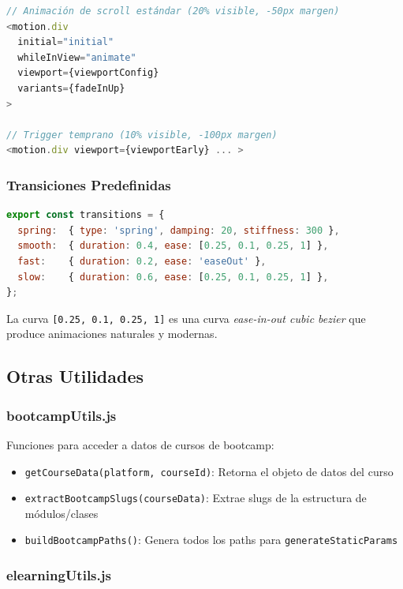 \documentclass[12pt,a4paper]{article}
\begin{document}
\begin{lstlisting}[language=JavaScript]
// Animación de scroll estándar (20% visible, -50px margen)
<motion.div
  initial="initial"
  whileInView="animate"
  viewport={viewportConfig}
  variants={fadeInUp}
>

// Trigger temprano (10% visible, -100px margen)
<motion.div viewport={viewportEarly} ... >
\end{lstlisting}

\subsubsection{Transiciones Predefinidas}

\begin{lstlisting}[language=JavaScript]
export const transitions = {
  spring:  { type: 'spring', damping: 20, stiffness: 300 },
  smooth:  { duration: 0.4, ease: [0.25, 0.1, 0.25, 1] },
  fast:    { duration: 0.2, ease: 'easeOut' },
  slow:    { duration: 0.6, ease: [0.25, 0.1, 0.25, 1] },
};
\end{lstlisting}

La curva \texttt{[0.25, 0.1, 0.25, 1]} es una curva \textit{ease-in-out cubic bezier} que produce animaciones naturales y modernas.

\subsection{Otras Utilidades}

\subsubsection{bootcampUtils.js}

Funciones para acceder a datos de cursos de bootcamp:
\begin{itemize}
  \item \texttt{getCourseData(platform, courseId)}: Retorna el objeto de datos del curso
  \item \texttt{extractBootcampSlugs(courseData)}: Extrae slugs de la estructura de módulos/clases
  \item \texttt{buildBootcampPaths()}: Genera todos los paths para \texttt{generateStaticParams}
\end{itemize}

\subsubsection{elearningUtils.js}
\end{document}
